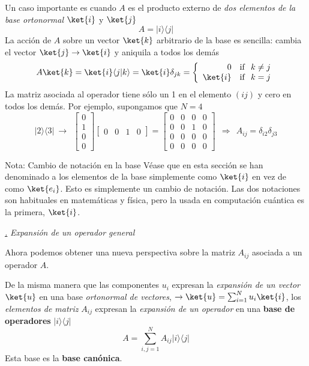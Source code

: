 \documentclass[a4paper,11pt]{book} %
\numberwithin{equation}{chapter}
\newcommand{\braket}[2]{\langle #1|#2\rangle}
\newcommand{\ketbra}[2]{| #1\rangle \! \langle #2|}
\def\subsubiContadorIt{\par\addtocounter{subsubsection}{1}\underline{\it\thesubsubsection.}\hskip0.5cm \setcounter{subsubsubsectionIt}{0}}
\newcommand{\SubsubiIt}[1]{
		\subsubiContadorIt \textit{#1}
	}
\newcounter{subsubsubsectionIt}[subsubsection]
\begin{document}
Un caso importante es cuando $A$ es el producto externo de \textit{dos elementos de la base ortonormal} $\ket{i}$ y $\ket{j}$ 
	\begin{equation}
	A = \ketbra{i}{j}
	\end{equation}
La acción de $A$ sobre un vector $\ket{k}$ arbitrario de la base es sencilla:  cambia el vector $\ket{j}\to \ket{i}$ y aniquila a todos los demás
	\begin{equation}
	A \ket{k} = \ket{i}\braket{j}{k} = \ket{i} \delta_{jk} = \left\{ \begin{array}{rl}
0 & {\rm if} ~~k\neq j \\ \ket{i} & {\rm if} ~~ k=j \end{array} \right.
	\end{equation}
La matriz asociada al operador  tiene sólo un 1 en el elemento $(ij)$ y cero en todos los demás. Por ejemplo, supongamos que 
$N=4$ 
	\begin{equation}
	\ketbra{2}{3} ~\to ~~
 \begin{bmatrix} 0 \\ 1 \\ 0 \\ 0 \end{bmatrix}\begin{bmatrix} 0 & 0 & 1 & 0 \end{bmatrix} = 
\begin{bmatrix}
0 &  0 & 0 &  0 \\  0 &  0 & 1&  0 \\ 0 &  0 & 0 &  0 \\ 0 &  0 & 0 &  0
\end{bmatrix} ~~\Rightarrow ~~ A_{ij} = \delta_{i2}\delta_{j3}
	\end{equation}

	\begin{mybox_blue}{Nota: Cambio de notación en la base}
	Véase que en esta sección se han denominado a los elementos de la base simplemente como $\ket{i}$ en vez de como $\ket{e_i}$. Esto es simplemente un cambio de notación. Las dos notaciones son habituales en matemáticas y física, pero la usada en computación cuántica es la primera, $\ket{i}$.
	\end{mybox_blue}

			\SubsubiIt{Expansión de un operador general}

Ahora podemos obtener una nueva perspectiva sobre la matriz $A_{ij}$ asociada a un operador $A$. 
\begin{mybox_gray2}{}
De la misma manera que las componentes $u_i$ expresan la \textit{expansión de un vector} $\ket{u}$ en una base \textit{ortonormal de vectores},  $\to \ket{u} = \sum_{i=1}^N u_i \ket{i}$, los \textit{elementos de matriz} $A_{ij}$ expresan la \textit{expansión de un operador} en una \textbf{base de operadores} $\ketbra{i}{j}$
	\begin{equation} \label{ec_formalismo_base_operadores}
 		A= \sum_{i,j=1}^N A_{ij} \ketbra{i}{j} 
 	\end{equation} 
Esta base es la \textbf{base canónica}.
\end{mybox_gray2}
\end{document}
